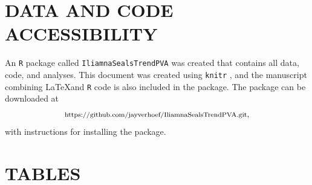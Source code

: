 \documentclass[12pt, titlepage]{article}\usepackage[]{graphicx}\usepackage[]{color}
\begin{document}
\section*{DATA AND CODE ACCESSIBILITY} 

 An \texttt{R} \citep{R:Deve:Core:ALan:2017} package called \texttt{IliamnaSealsTrendPVA} was created that contains all data, code, and analyses. This document was created using \texttt{knitr} \citep{Yihu:impl:2014,Yihu:dyna:2015,Yihu:knit:2016}, and the manuscript combining \LaTeX and \texttt{R} code is also included in the package. The package can be downloaded at 
 \[
 \footnotesize
 \textrm{https://github.com/jayverhoef/IliamnaSealsTrendPVA.git},
 \] 
 with instructions for installing the package.  





\clearpage

\section*{TABLES}
\end{document}

